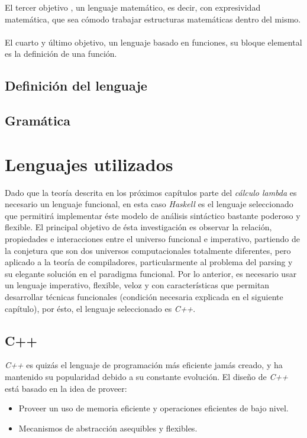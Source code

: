	El tercer objetivo , un lenguaje matemático, es decir, con expresividad matemática, que sea cómodo trabajar estructuras matemáticas dentro del mismo.\\\\
	\noindent
	El cuarto y último objetivo, un lenguaje basado en funciones, su bloque elemental es la definición de una función.
	
	\subsection{Definición del lenguaje}
	
	\subsection{Gramática}

\section{Lenguajes utilizados}
Dado que la teoría descrita en los próximos capítulos parte del \emph{cálculo lambda} es necesario un lenguaje funcional, en esta caso \emph{Haskell} es el lenguaje seleccionado que permitirá implementar éste modelo de análisis sintáctico bastante poderoso y flexible. El principal objetivo de ésta investigación es observar la relación, propiedades e interacciones entre el universo funcional e imperativo, partiendo de la conjetura que son dos universos computacionales totalmente diferentes, pero aplicado a la teoría de compiladores, particularmente al problema del parsing y su elegante solución en el paradigma funcional. Por lo anterior, es necesario usar un lenguaje imperativo, flexible, veloz y con características que permitan desarrollar técnicas funcionales (condición necesaria explicada en el siguiente capítulo), por ésto, el lenguaje seleccionado es \emph{C++}.

	\subsection{C++}
	\emph{C++} es quizás el lenguaje de programación más eficiente jamás creado, y ha mantenido su popularidad debido a su constante evolución. El diseño de \emph{C++} está basado en la idea de proveer:	
	\begin{itemize}
		\item Proveer un uso de memoria eficiente y operaciones eficientes de bajo nivel.
		\item Mecanismos de abstracción asequibles y flexibles. \cite{Bjarne2013}
	\end{itemize}
	
